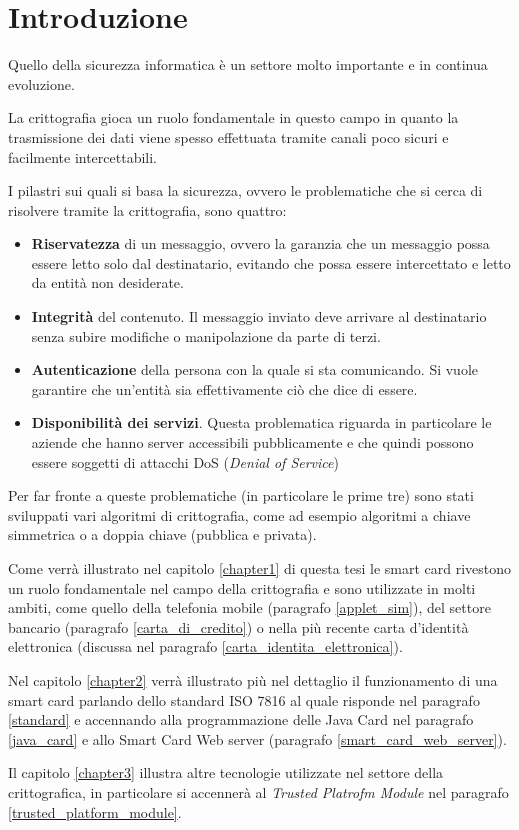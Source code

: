 \chapter*{Introduzione}
\label{introduction}
Quello della sicurezza informatica è un settore molto importante e in continua evoluzione.

La crittografia gioca un ruolo fondamentale in questo campo in quanto la trasmissione dei dati viene spesso effettuata tramite canali poco sicuri e facilmente intercettabili.

I pilastri sui quali si basa la sicurezza, ovvero le problematiche che si cerca di risolvere tramite la crittografia, sono quattro:

\begin{itemize}
    \item \textbf{Riservatezza} di un messaggio, ovvero la garanzia che un messaggio possa essere letto solo dal destinatario, evitando che possa essere intercettato e letto da entità non desiderate.
    \item \textbf{Integrità} del contenuto. Il messaggio inviato deve arrivare al destinatario senza subire modifiche o manipolazione da parte di terzi.
    \item \textbf{Autenticazione} della persona con la quale si sta comunicando. Si vuole garantire che un'entità sia effettivamente ciò che dice di essere.
    \item \textbf{Disponibilità dei servizi}. Questa problematica riguarda in particolare le aziende che hanno server accessibili pubblicamente e che quindi possono essere soggetti di attacchi DoS (\textit{Denial of Service})
\end{itemize}

Per far fronte a queste problematiche (in particolare le prime tre) sono stati sviluppati vari algoritmi di crittografia, come ad esempio algoritmi a chiave simmetrica o a doppia chiave (pubblica e privata).

Come verrà illustrato nel capitolo \ref{chapter1} di questa tesi le smart card rivestono un ruolo fondamentale nel campo della crittografia e sono utilizzate in molti ambiti, come quello della telefonia mobile (paragrafo \ref{applet_sim}), del settore bancario (paragrafo \ref{carta_di_credito}) o nella più recente carta d'identità elettronica (discussa nel paragrafo \ref{carta_identita_elettronica}).

Nel capitolo \ref{chapter2} verrà illustrato più nel dettaglio il funzionamento di una smart card parlando dello standard ISO 7816 al quale risponde nel paragrafo \ref{standard} e accennando alla programmazione delle Java Card nel paragrafo \ref{java_card} e allo Smart Card Web server (paragrafo \ref{smart_card_web_server}).

Il capitolo \ref{chapter3} illustra altre tecnologie utilizzate nel settore della crittografica, in particolare si accennerà al \textit{Trusted Platrofm Module} nel paragrafo \ref{trusted_platform_module}.

